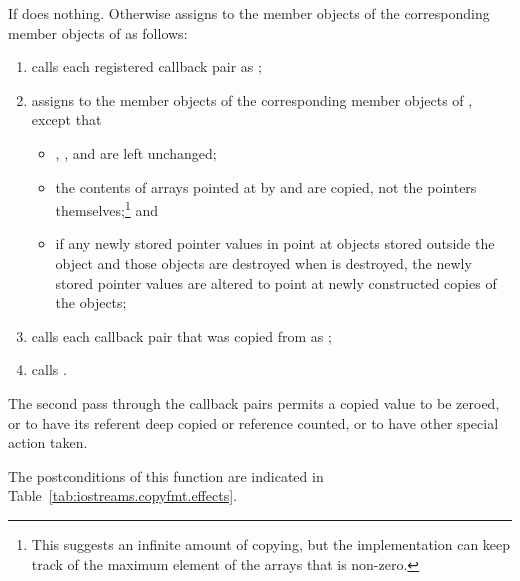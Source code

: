 \begin{itemdescr}
\pnum
\effects
If
does nothing.
Otherwise assigns to the member objects of
the corresponding member objects of  as follows:

\begin{enumerate}
\item calls each registered callback pair  as
;

\item assigns to the member objects of  the corresponding member objects of
, except that

\begin{itemize}
\item {}, , and  are left unchanged;

\item the contents of arrays pointed at by  and  are copied,
not the pointers themselves;\footnote{ This suggests an infinite amount of copying, but the implementation can keep
track of the maximum element of the arrays that is non-zero.}
and

\item if any newly stored pointer values in  point at objects stored outside
the object  and those objects are destroyed when  is destroyed, the
newly stored pointer values are altered to point at newly constructed copies of the
objects;
\end{itemize}

\item calls each callback pair that was copied from  as
;

\item calls .

\end{enumerate}

\pnum
\realnote The second pass through the callback pairs permits a copied 
value to be zeroed, or to have its referent deep copied or reference counted, or to have
other special action taken.

\pnum
\postconditions
The postconditions of this function are indicated in Table~\ref{tab:iostreams.copyfmt.effects}.



\end{itemdescr}
